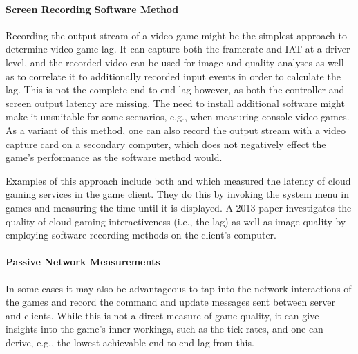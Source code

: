 \paragraph{Screen Recording Software Method}
Recording the output stream of a video game might be the simplest approach to determine video game lag. It can capture both the framerate and \gls{IAT} at a driver level, and the recorded video can be used for image and quality analyses as well as to correlate it to additionally recorded input events in order to calculate the lag. This is not the complete end-to-end lag however, as both the controller and screen output latency are missing. The need to install additional software might make it unsuitable for some scenarios, e.g., when measuring console video games. As a variant of this method, one can also record the output stream with a video capture card on a secondary computer, which does not negatively effect the game's performance as the software method would.

Examples of this approach include both \cite{Chen:2011:MLC:2072298.2071991} and \cite{6670099} which measured the latency of cloud gaming services in the game client. They do this by invoking the system menu in games and measuring the time until it is displayed. A 2013 paper \cite{6574660} investigates the quality of cloud gaming interactiveness (i.e., the lag) as well as image quality by employing software recording methods on the client's computer.


\paragraph{Passive Network Measurements}
In some cases it may also be advantageous to tap into the network interactions of the games and record the command and update messages sent between server and clients. While this is not a direct measure of game quality, it can give insights into the game's inner workings, such as the tick rates, and one can derive, e.g., the lowest achievable end-to-end lag from this.

